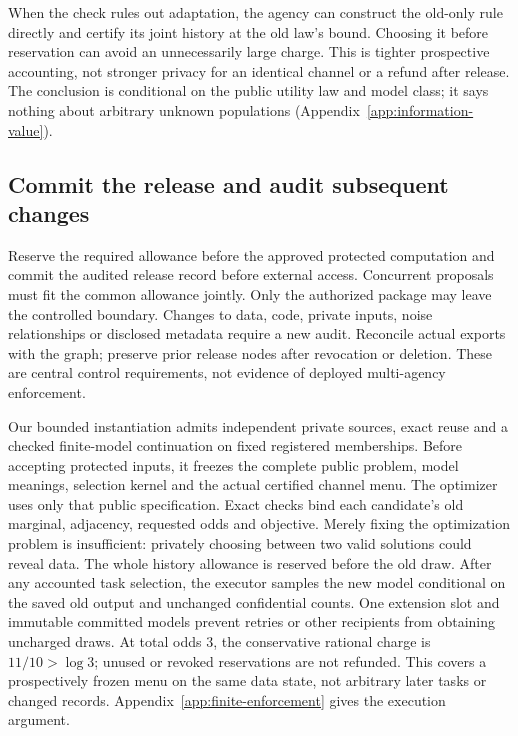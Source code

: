 When the check rules out adaptation, the agency can construct the
old-only rule directly and certify its joint history at the old law's
bound. Choosing it before reservation can avoid an unnecessarily large
charge. This is tighter prospective accounting, not stronger privacy
for an identical channel or a refund after release. The conclusion is
conditional on the public utility law and model class; it says nothing
about arbitrary unknown populations (Appendix~\ref{app:information-value}).

\subsection{Commit the release and audit subsequent changes}
\label{sec:workload-extension}
\label{sec:implemented-assurance}
Reserve the required allowance before the approved protected computation
and commit the audited release record before external access. Concurrent
proposals must fit the common allowance jointly. Only the authorized
package may leave the controlled boundary. Changes to data, code,
private inputs, noise relationships or disclosed metadata require a new
audit. Reconcile actual exports with the graph; preserve prior release
nodes after revocation or deletion. These are central control requirements,
not evidence of deployed multi-agency enforcement.

Our bounded instantiation admits independent private sources, exact reuse
and a checked finite-model continuation on fixed registered memberships.
Before accepting protected inputs, it freezes the complete public problem,
model meanings, selection kernel and the actual certified channel menu.
The optimizer uses only that public specification. Exact checks bind each
candidate's old marginal, adjacency, requested odds and objective. Merely
fixing the optimization problem is insufficient: privately choosing between
two valid solutions could reveal data. The whole history allowance is
reserved before the old draw. After any accounted
task selection, the executor samples the new model conditional on the
saved old output and unchanged confidential counts. One extension slot
and immutable committed models prevent retries or other recipients from
obtaining uncharged draws. At total odds $3$, the conservative rational
charge is $11/10>\log3$; unused or revoked reservations are not refunded.
This covers a prospectively frozen menu on the same data state, not arbitrary later
tasks or changed records. Appendix~\ref{app:finite-enforcement} gives
the execution argument.

